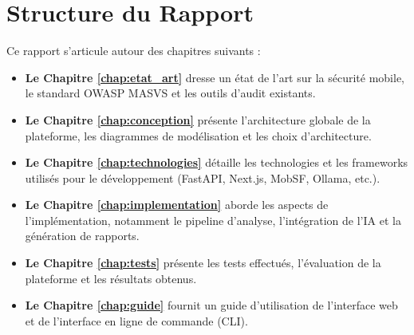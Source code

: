 \section{Structure du Rapport}
Ce rapport s'articule autour des chapitres suivants :
\begin{itemize}[label=\textcolor{PrimaryBlue}{\faChevronRight}]
    \item \textbf{Le Chapitre \ref{chap:etat_art}} dresse un état de l'art sur la sécurité mobile, le standard OWASP MASVS et les outils d'audit existants.
    \item \textbf{Le Chapitre \ref{chap:conception}} présente l'architecture globale de la plateforme, les diagrammes de modélisation et les choix d'architecture.
    \item \textbf{Le Chapitre \ref{chap:technologies}} détaille les technologies et les frameworks utilisés pour le développement (FastAPI, Next.js, MobSF, Ollama, etc.).
    \item \textbf{Le Chapitre \ref{chap:implementation}} aborde les aspects de l'implémentation, notamment le pipeline d'analyse, l'intégration de l'IA et la génération de rapports.
    \item \textbf{Le Chapitre \ref{chap:tests}} présente les tests effectués, l'évaluation de la plateforme et les résultats obtenus.
    \item \textbf{Le Chapitre \ref{chap:guide}} fournit un guide d'utilisation de l'interface web et de l'interface en ligne de commande (CLI).
\end{itemize}

\cleardoublepage
